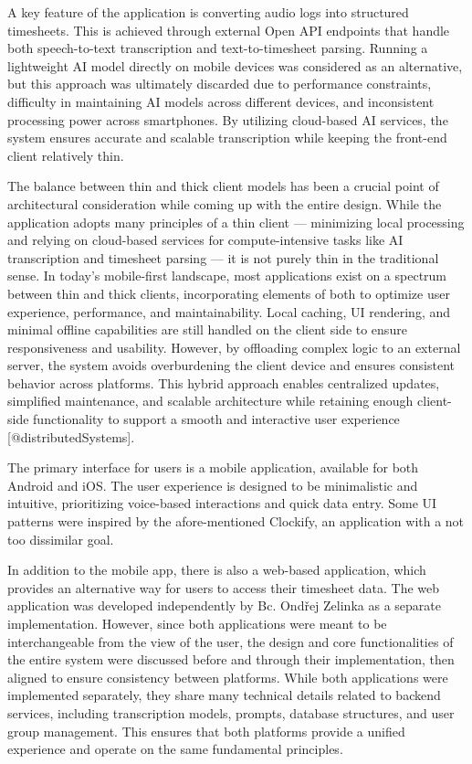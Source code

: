 \documentclass[
  digital,     %
  oneside,     %
  nosansbold,  %
  nocolorbold, %
  lof,         %
  lot,         %
]{fithesis4}
\begin{document}
\begin{markdown}
A key feature of the application is converting audio logs into structured timesheets. This is achieved through external Open API endpoints that handle both speech-to-text transcription and text-to-timesheet parsing. Running a lightweight AI model directly on mobile devices was considered as an alternative, but this approach was ultimately discarded due to performance constraints, difficulty in maintaining AI models across different devices, and inconsistent processing power across smartphones. By utilizing cloud-based AI services, the system ensures accurate and scalable transcription while keeping the front-end client relatively thin.

The balance between thin and thick client models has been a crucial point of architectural consideration while coming up with the entire design. While the application adopts many principles of a thin client — minimizing local processing and relying on cloud-based services for compute-intensive tasks like AI transcription and timesheet parsing — it is not purely thin in the traditional sense. In today’s mobile-first landscape, most applications exist on a spectrum between thin and thick clients, incorporating elements of both to optimize user experience, performance, and maintainability. Local caching, UI rendering, and minimal offline capabilities are still handled on the client side to ensure responsiveness and usability. However, by offloading complex logic to an external server, the system avoids overburdening the client device and ensures consistent behavior across platforms. This hybrid approach enables centralized updates, simplified maintenance, and scalable architecture while retaining enough client-side functionality to support a smooth and interactive user experience [@distributedSystems].

The primary interface for users is a mobile application, available for both Android and iOS. The user experience is designed to be minimalistic and intuitive, prioritizing voice-based interactions and quick data entry. Some UI patterns were inspired by the afore-mentioned Clockify, an application with a not too dissimilar goal.  

In addition to the mobile app, there is also a web-based application, which provides an alternative way for users to access their timesheet data. The web application was developed independently by Bc. Ondřej Zelinka as a separate implementation. However, since both applications were meant to be interchangeable from the view of the user, the design and core functionalities of the entire system were discussed before and through their implementation, then aligned to ensure consistency between platforms. While both applications were implemented separately, they share many technical details related to backend services, including transcription models, prompts, database structures, and user group management. This ensures that both platforms provide a unified experience and operate on the same fundamental principles.


\end{markdown}
\end{document}
